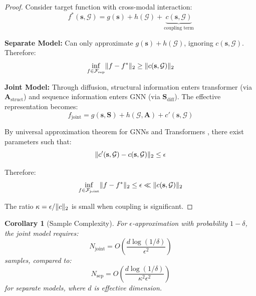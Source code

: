 \documentclass[11pt]{article}
\newtheorem{proof}{Proof}
\newtheorem{corollary}{Corollary}
\DeclarePairedDelimiter{\norm}{\lVert}{\rVert}
\begin{document}
\begin{proof}
Consider target function with cross-modal interaction:
\begin{equation}
    f^*(\mathbf{s}, \mathcal{G}) = g(\mathbf{s}) + h(\mathcal{G}) + \underbrace{c(\mathbf{s}, \mathcal{G})}_{\text{coupling term}}
\end{equation}

\textbf{Separate Model:} Can only approximate $g(\mathbf{s}) + h(\mathcal{G})$, ignoring $c(\mathbf{s}, \mathcal{G})$. Therefore:
\begin{equation}
    \inf_{f \in \mathcal{F}_{\text{sep}}} \norm{f - f^*}_2 \geq \norm{c(\mathbf{s}, \mathcal{G})}_2
\end{equation}

\textbf{Joint Model:} Through diffusion, structural information enters transformer (via $\mathbf{A}_{\text{struct}}$) and sequence information enters GNN (via $\mathbf{S}_{\text{diff}}$). The effective representation becomes:
\begin{equation}
    f_{\text{joint}} = g(\mathbf{s}, \mathbf{S}) + h(\mathcal{G}, \mathbf{A}) + c'(\mathbf{s}, \mathcal{G})
\end{equation}

By universal approximation theorem for GNNs \citep{xu2019powerful} and Transformers \citep{yun2020transformers}, there exist parameters such that:
\begin{equation}
    \norm{c'(\mathbf{s}, \mathcal{G}) - c(\mathbf{s}, \mathcal{G})}_2 \leq \epsilon
\end{equation}

Therefore:
\begin{equation}
    \inf_{f \in \mathcal{F}_{\text{joint}}} \norm{f - f^*}_2 \leq \epsilon \ll \norm{c(\mathbf{s}, \mathcal{G})}_2
\end{equation}

The ratio $\kappa = \epsilon / \norm{c}_2$ is small when coupling is significant.
\end{proof}

\begin{corollary}[Sample Complexity]
For $\epsilon$-approximation with probability $1-\delta$, the joint model requires:
\begin{equation}
    N_{\text{joint}} = O\left(\frac{d \log(1/\delta)}{\epsilon^2}\right)
\end{equation}
samples, compared to:
\begin{equation}
    N_{\text{sep}} = O\left(\frac{d \log(1/\delta)}{\kappa^2 \epsilon^2}\right)
\end{equation}
for separate models, where $d$ is effective dimension.
\end{corollary}
\end{document}
